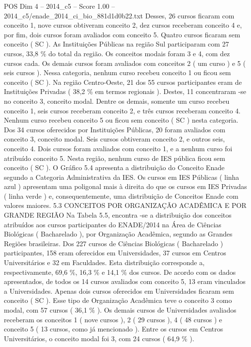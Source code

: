 \begin{textsample}{POS Dim 4 – 2014\_c5 – Score 1.00 – 2014\_c5/enade\_2014\_ci\_bio\_881d1d0b22.txt}
Desses, 26 cursos ficaram com conceito 1, nove cursos obtiveram conceito 2, dez cursos receberam conceito 4 e, por fim, dois cursos foram avaliados com conceito 5.
Quatro cursos ficaram sem conceito ( SC ).
As Instituições Públicas na região Sul participaram com 27 cursos, 33,8 \% do total da região.
Os conceitos modais foram 3 e 4, com dez cursos cada.
Os demais cursos foram avaliados com conceitos 2 ( um curso ) e 5 ( seis cursos ).
Nessa categoria, nenhum curso recebeu conceito 1 ou ficou sem conceito ( SC ).
Na região Centro-Oeste, 21 dos 55 cursos participantes eram de Instituições Privadas ( 38,2 \% em termos regionais ).
Destes, 11 concentraram -se no conceito 3, conceito modal.
Dentre os demais, somente um curso recebeu conceito 1, seis cursos receberam conceito 2, e três cursos receberam conceito 4.
Nenhum curso recebeu conceito 5 ou ficou sem conceito ( SC ) nesta categoria.
Dos 34 cursos oferecidos por Instituições Públicas, 20 foram avaliados com conceito 3, conceito modal.
Seis cursos obtiveram conceito 2, e outros seis, conceito 4.
Dois cursos foram avaliados com conceito 1, e a nenhum curso foi atribuído conceito 5.
Nesta região, nenhum curso de IES pública ficou sem conceito ( SC ).
O Gráfico 5.4 apresenta a distribuição do Conceito Enade segundo a Categoria Administrativa da IES.
Os cursos em IES Públicas ( linha azul ) apresentam uma poligonal mais à direita do que os cursos em IES Privadas ( linha verde ) e, consequentemente, uma distribuição de Conceitos Enade com valores maiores. 5.3 CONCEITOS POR ORGANIZAÇÃO ACADÊMICA E POR GRANDE REGIÃO Na Tabela 5.5, encontra -se a distribuição dos conceitos atribuídos aos cursos participantes do ENADE/2014 na Área de Ciências Biológicas ( Bacharelado ), por Organização Acadêmica, segundo as Grandes Regiões brasileiras.
Dos 227 cursos de Ciências Biológicas ( Bacharelado ) participantes, 158 eram oferecidos em Universidades, 37 cursos em Centros Universitários e 32 em Faculdades.
Esta distribuição corresponde a, respectivamente, 69,6 \%, 16,3 \% e 14,1 \% dos cursos.
De acordo com os dados apresentados, de todos os 14 cursos avaliados com conceito 5, 13 eram vinculados a Universidades.
Apenas dois cursos oferecidos em Universidades ficaram sem conceito ( SC ).
Esse tipo de Organização Acadêmica teve o conceito 3 como modal, com 57 cursos ( 36,1 \% ).
Os demais cursos de Universidades avaliados receberam os conceitos 1 ( nove cursos ), 2 ( 29 cursos ), 4 ( 48 cursos ) e conceito 5 ( 13 cursos, como já mencionado ).
Entre os cursos em Centros Universitários, o conceito modal foi 3, com 24 cursos ( 64,9 \% ).

\end{textsample}
